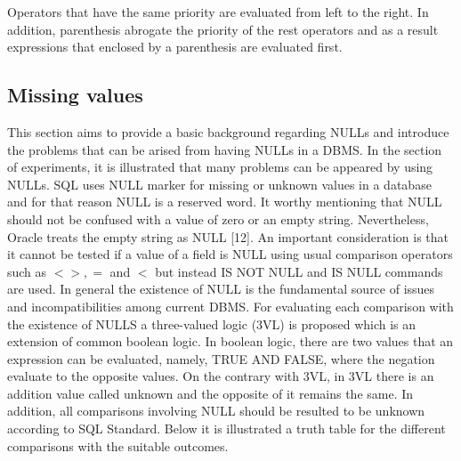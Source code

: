 Operators that have the same priority are evaluated from left to the right. In addition, parenthesis abrogate the priority of the rest operators and as a result expressions that enclosed by a parenthesis are evaluated first.    
 
 
\subsection{Missing values} 

This section aims to provide a basic background regarding NULLs and introduce the problems that can be arised from having NULLs in a DBMS. In the section of experiments, it is illustrated that many problems can be appeared by using NULLs. SQL uses NULL marker for missing or unknown values in a database and for that reason NULL is a reserved word. It worthy mentioning that NULL should not be confused with a value of zero or an empty string. Nevertheless, Oracle treats the empty string as NULL [12].  An important consideration is that it cannot be tested if a value of a field is NULL using usual comparison operators such as $ <>, = $ and $<$ but instead IS NOT NULL and IS NULL commands are used. In general the existence of NULL is the fundamental source of issues and incompatibilities among current DBMS. For evaluating each comparison with the existence of NULLS a three-valued logic (3VL) is proposed which is an extension of common boolean logic. In boolean logic, there are two values that an expression can be evaluated, namely, TRUE AND FALSE, where the negation evaluate to the opposite values. On the contrary with 3VL, in 3VL there is an addition value called unknown and the opposite of it remains the same. In addition, all comparisons involving NULL should be resulted to be unknown according to SQL Standard. Below it is illustrated a truth table for the different comparisons with the suitable outcomes.    


